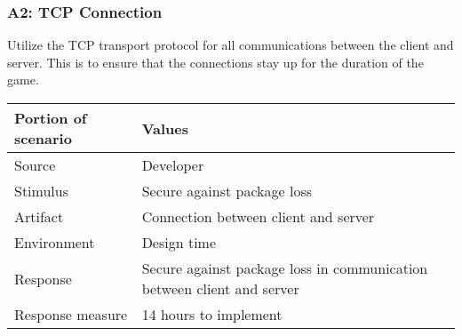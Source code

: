 \subsubsection*{A2: TCP Connection}
Utilize the TCP transport protocol for all communications between the client
and server. This is to ensure that the connections stay up for the duration
of the game.

\begin{tabular}{|m{}|m{}|}
\hline
{\bf Portion of scenario} & {\bf Values} \\ \hline
Source & Developer \\ \hline
Stimulus & Secure against package loss \\ \hline
Artifact & Connection between client and server \\ \hline
Environment & Design time \\ \hline
Response & Secure against package loss in communication between client and
server \\ \hline
Response measure & 14 hours to implement \\ \hline
\end{tabular}

